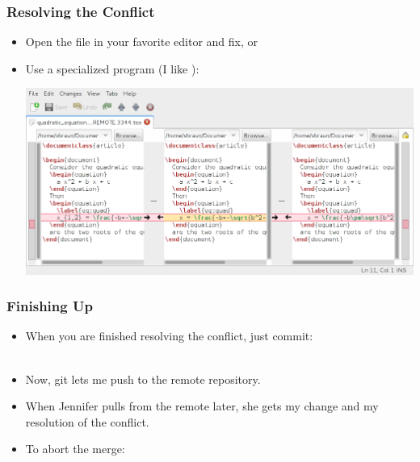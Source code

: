 \begin{frame}
  \frametitle{Resolving the Conflict}

  \begin{itemize}
  \item<1-> Open the file in your favorite editor and fix, or
  \item<2-> Use a specialized program (I like ): \\
    \medskip

    \includegraphics[width=\linewidth]{images/mergetool_meld}
  \end{itemize}
\end{frame}


\begin{frame}
  \frametitle{Finishing Up}

  \begin{itemize}
  \item<1-> When you are finished resolving the conflict, just commit:\\
    \\
  \item<2-> Now, git lets me push to the remote repository.
  \item<3-> When Jennifer pulls from the remote later, she gets my change
    and my resolution of the conflict.
  \item<4-> To abort the merge:\\
  \end{itemize}
\end{frame}


{
  \begin{frame}[plain]
  \end{frame}
}


